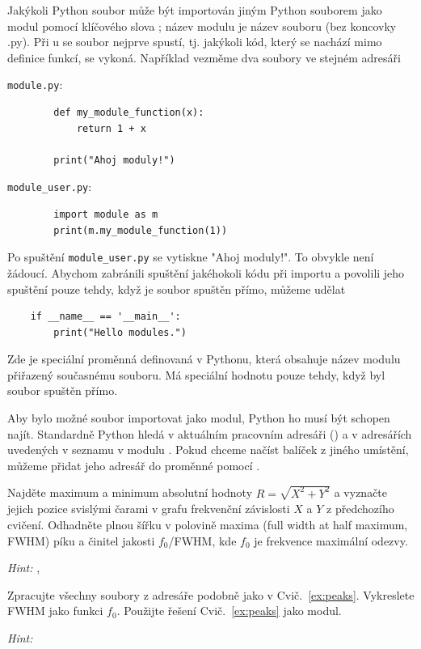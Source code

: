 \begin{syntax}
    Jakýkoli Python soubor může být importován jiným Python souborem jako modul pomocí klíčového slova ; název modulu je název souboru (bez koncovky .py). Při u se soubor nejprve spustí, tj. jakýkoli kód, který se nachází mimo definice funkcí, se vykoná. Například vezměme dva soubory ve stejném adresáři

    \verb|module.py|:
    \begin{lstlisting}
        def my_module_function(x):
            return 1 + x

        print("Ahoj moduly!")
    \end{lstlisting}

    \verb|module_user.py|:
    \begin{lstlisting}
        import module as m
        print(m.my_module_function(1))
    \end{lstlisting}

    Po spuštění \verb|module_user.py| se vytiskne "Ahoj moduly!". To obvykle není žádoucí. Abychom zabránili spuštění jakéhokoli kódu při importu a povolili jeho spuštění pouze tehdy, když je soubor spuštěn přímo, můžeme udělat
\begin{lstlisting}
    if __name__ == '__main__':
        print("Hello modules.")
\end{lstlisting}
    Zde je  speciální proměnná definovaná v Pythonu, která obsahuje název modulu přiřazený současnému souboru. Má speciální hodnotu  pouze tehdy, když byl soubor spuštěn přímo.

    Aby bylo možné soubor importovat jako modul, Python ho musí být schopen najít. Standardně Python hledá v aktuálním pracovním adresáři () a v adresářích uvedených v seznamu  v modulu . Pokud chceme načíst balíček z jiného umístění, můžeme přidat jeho adresář do proměnné  pomocí .
\end{syntax}
\begin{exercise}
    \label{ex:peaks}
    Najděte maximum a minimum absolutní hodnoty $R = \sqrt{X^2 + Y^2}$ a vyznačte jejich pozice svislými čarami v grafu frekvenční závislosti $X$ a $Y$ z předchozího cvičení. Odhadněte plnou šířku v polovině maxima (full width at half maximum, FWHM) píku a činitel jakosti $f_0$/FWHM, kde $f_0$ je frekvence maximální odezvy. 
    
    \emph{Hint:} , 
\end{exercise}
\begin{exercise}
    \label{ex:peaks-all}
    Zpracujte všechny soubory z adresáře  podobně jako v Cvič.~\ref{ex:peaks}. Vykreslete FWHM jako funkci $f_0$. Použijte řešení Cvič.~\ref{ex:peaks} jako modul.
    
    \emph{Hint:} 
\end{exercise}


